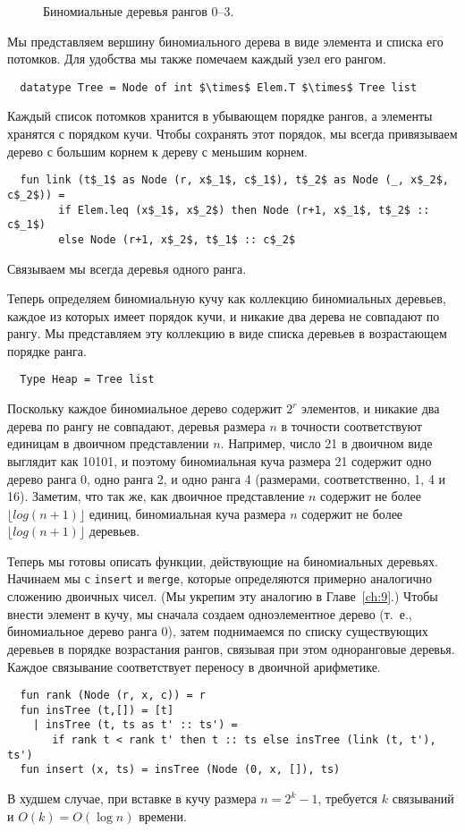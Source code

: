 \begin{figure}[h]
  \centering
  
  \caption{Биномиальные деревья рангов 0--3.}
  \label{fig:3.3}
\end{figure}

Мы представляем вершину биномиального дерева в виде элемента и списка
его потомков. Для удобства мы также помечаем каждый узел его рангом.
\begin{lstlisting}
  datatype Tree = Node of int $\times$ Elem.T $\times$ Tree list
\end{lstlisting}
Каждый список потомков хранится в убывающем порядке рангов, а элементы
хранятся с порядком кучи.  Чтобы сохранять этот порядок, мы всегда
привязываем дерево с большим корнем к дереву с меньшим корнем.
\begin{lstlisting}
  fun link (t$_1$ as Node (r, x$_1$, c$_1$), t$_2$ as Node (_, x$_2$, c$_2$)) =
        if Elem.leq (x$_1$, x$_2$) then Node (r+1, x$_1$, t$_2$ :: c$_1$)
        else Node (r+1, x$_2$, t$_1$ :: c$_2$
\end{lstlisting}
Связываем мы всегда деревья одного ранга.

Теперь определяем биномиальную кучу как коллекцию биномиальных
деревьев, каждое из которых имеет порядок кучи, и никакие два дерева
не совпадают по рангу. Мы представляем эту коллекцию в виде списка
деревьев в возрастающем порядке ранга.
\begin{lstlisting}
  Type Heap = Tree list
\end{lstlisting}
Поскольку каждое биномиальное дерево содержит $2^r$ элементов, и
никакие два дерева по рангу не совпадают, деревья размера $n$ в
точности соответствуют единицам в двоичном представлении
$n$. Например, число 21 в двоичном виде выглядит как 10101, и поэтому
биномиальная куча размера 21 содержит одно дерево ранга 0, одно ранга
2, и одно ранга 4 (размерами, соответственно, 1, 4 и 16). Заметим, что
так же, как двоичное представление $n$ содержит не более $\lfloor log
(n+1)\rfloor$ единиц, биномиальная куча размера $n$ содержит не более
$\lfloor log(n+1) \rfloor$ деревьев.

Теперь мы готовы описать функции, действующие на биномиальных
деревьях. Начинаем мы с \lstinline!insert! и \lstinline!merge!,
которые определяются примерно аналогично сложению двоичных чисел. (Мы
укрепим эту аналогию в Главе~\ref{ch:9}.) Чтобы внести элемент в кучу,
мы сначала создаем одноэлементное дерево (т.~е., биномиальное дерево
ранга 0), затем поднимаемся по списку существующих деревьев в порядке
возрастания рангов, связывая при этом одноранговые деревья. Каждое
связывание соответствует переносу в двоичной арифметике.
\begin{lstlisting}
  fun rank (Node (r, x, c)) = r
  fun insTree (t,[]) = [t]
    | insTree (t, ts as t' :: ts') =
       if rank t < rank t' then t :: ts else insTree (link (t, t'), ts')
  fun insert (x, ts) = insTree (Node (0, x, []), ts)
\end{lstlisting}
В худшем случае, при вставке в кучу размера $n = 2^k -1$, требуется
$k$ связываний и $O(k) = O(\log n)$ времени.

